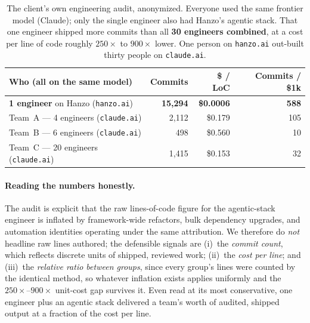 \documentclass[11pt,letterpaper]{article}
\begin{document}
\begin{table}[H]
\centering
\small
\begin{tabular}{l r r r}
\toprule
\textbf{Who (all on the same model)} & \textbf{Commits} & \textbf{\$ / LoC} & \textbf{Commits / \$1k} \\
\midrule
\textbf{1 engineer} on Hanzo (\texttt{hanzo.ai}) & \textbf{15{,}294} & \textbf{\$0.0006} & \textbf{588} \\
\midrule
Team~A --- 4 engineers (\texttt{claude.ai}) & 2{,}112 & \$0.179 & 105 \\
Team~B --- 6 engineers (\texttt{claude.ai}) & 498   & \$0.560 & 10  \\
Team~C --- 20 engineers (\texttt{claude.ai}) & 1{,}415 & \$0.153 & 32  \\
\bottomrule
\end{tabular}
\caption{The client's own engineering audit, anonymized. Everyone used the same
frontier model (Claude); only the single engineer also had Hanzo's agentic stack.
That one engineer shipped more commits than all \textbf{30 engineers combined}, at a
cost per line of code roughly $250\times$ to $900\times$ lower. One person on
\texttt{hanzo.ai} out-built thirty people on \texttt{claude.ai}.}
\end{table}

\paragraph{Reading the numbers honestly.} The audit is explicit that the raw
lines-of-code figure for the agentic-stack engineer is inflated by framework-wide
refactors, bulk dependency upgrades, and automation identities operating under the
same attribution. We therefore do \emph{not} headline raw lines authored; the
defensible signals are (i)~the \emph{commit count}, which reflects discrete units
of shipped, reviewed work; (ii)~the \emph{cost per line}; and (iii)~the
\emph{relative ratio between groups}, since every group's lines were counted by the
identical method, so whatever inflation exists applies uniformly and the
$250\times$--$900\times$ unit-cost gap survives it. Even read at its most
conservative, one engineer plus an agentic stack delivered a team's worth of
audited, shipped output at a fraction of the cost per line.
\end{document}
